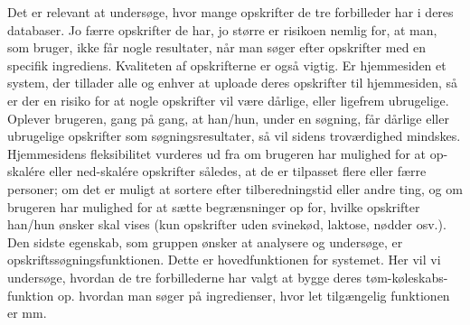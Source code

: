 Det er relevant at undersøge, hvor mange opskrifter de tre forbilleder har i deres databaser. Jo færre opskrifter de har, jo større er risikoen nemlig for, at man, som bruger, ikke får nogle resultater, når man søger efter opskrifter med en specifik ingrediens. Kvaliteten af opskrifterne er også vigtig. Er hjemmesiden \fx et system, der tillader alle og enhver at uploade deres opskrifter til hjemmesiden, så er der en risiko for at nogle opskrifter vil være dårlige, eller ligefrem ubrugelige. Oplever brugeren, gang på gang, at han/hun, under en søgning, får dårlige eller ubrugelige opskrifter som søgningsresultater, så vil sidens troværdighed mindskes. 
Hjemmesidens fleksibilitet vurderes ud fra om brugeren har mulighed for \fx at op-skalére eller ned-skalére opskrifter således, at de er tilpasset flere eller færre personer; om det er muligt at sortere efter tilberedningstid eller andre ting, og om brugeren har mulighed for at sætte begrænsninger op for, hvilke opskrifter han/hun ønsker skal vises (\fx kun opskrifter uden svinekød, laktose, nødder osv.). Den sidste egenskab, som gruppen ønsker at analysere og undersøge, er opskriftssøgningsfunktionen. Dette er hovedfunktionen for systemet. Her vil vi undersøge, hvordan de tre forbillederne har valgt at bygge deres tøm-køleskabs-funktion op. \Fx hvordan man søger på ingredienser, hvor let tilgængelig funktionen er mm.